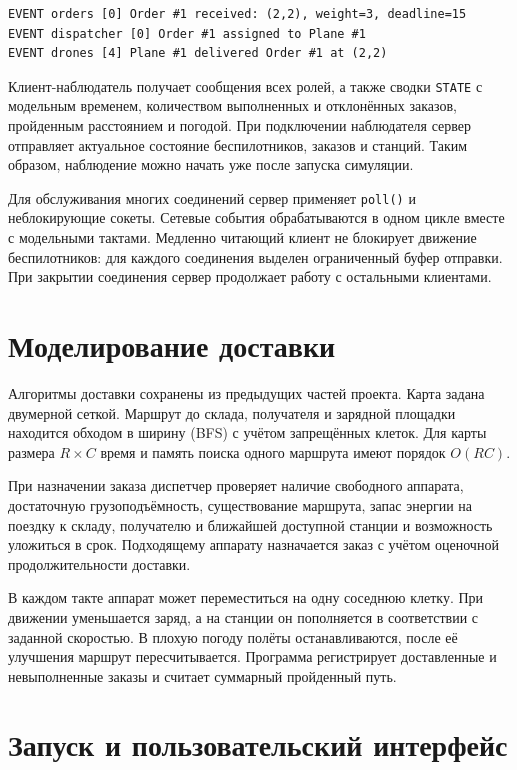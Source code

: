 \documentclass[12pt,a4paper]{article}
\begin{document}
\begin{lstlisting}
EVENT orders [0] Order #1 received: (2,2), weight=3, deadline=15
EVENT dispatcher [0] Order #1 assigned to Plane #1
EVENT drones [4] Plane #1 delivered Order #1 at (2,2)
\end{lstlisting}

Клиент-наблюдатель получает сообщения всех ролей, а также сводки \texttt{STATE} с модельным временем, количеством выполненных и отклонённых заказов, пройденным расстоянием и погодой. При подключении наблюдателя сервер отправляет актуальное состояние беспилотников, заказов и станций. Таким образом, наблюдение можно начать уже после запуска симуляции.

Для обслуживания многих соединений сервер применяет \texttt{poll()} и неблокирующие сокеты. Сетевые события обрабатываются в одном цикле вместе с модельными тактами. Медленно читающий клиент не блокирует движение беспилотников: для каждого соединения выделен ограниченный буфер отправки. При закрытии соединения сервер продолжает работу с остальными клиентами.

\section{Моделирование доставки}

Алгоритмы доставки сохранены из предыдущих частей проекта. Карта задана двумерной сеткой. Маршрут до склада, получателя и зарядной площадки находится обходом в ширину (BFS) с учётом запрещённых клеток. Для карты размера $R\times C$ время и память поиска одного маршрута имеют порядок $O(RC)$.

При назначении заказа диспетчер проверяет наличие свободного аппарата, достаточную грузоподъёмность, существование маршрута, запас энергии на поездку к складу, получателю и ближайшей доступной станции и возможность уложиться в срок. Подходящему аппарату назначается заказ с учётом оценочной продолжительности доставки.

В каждом такте аппарат может переместиться на одну соседнюю клетку. При движении уменьшается заряд, а на станции он пополняется в соответствии с заданной скоростью. В плохую погоду полёты останавливаются, после её улучшения маршрут пересчитывается. Программа регистрирует доставленные и невыполненные заказы и считает суммарный пройденный путь.

\section{Запуск и пользовательский интерфейс}
\end{document}
